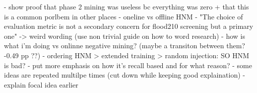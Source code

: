 - show proof that phase 2 mining was useless bc everything was zero + that this is a common porlbem in other places
- oneline vs offline HNM
- "The choice of evaluation metric is not a secondary concern for flood210
screening but a primary one" -> weird wording (use non trivial guide on how to word research)
- how is what i'm doing vs onlinne negative mining?  (maybe a transiton between them?
-0.49 pp ??)
- ordering HNM > extended training > random injection: SO HNM is bad?
- put more emphasis on how it's recall based and for what reason? 
- some ideas are repeated multilpe times (cut down while keeping good explaination)
- explain focal idea earlier